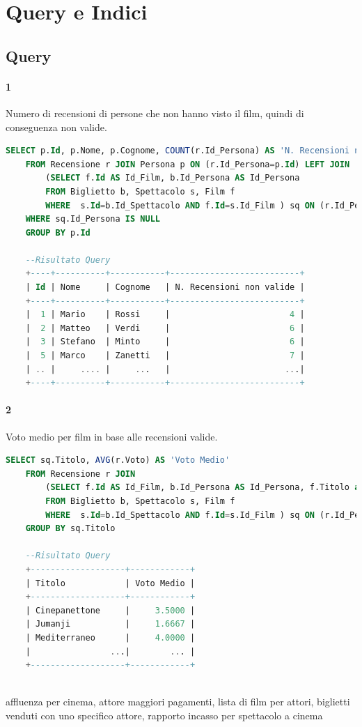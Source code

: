 \documentclass[10pt]{article}
\begin{document}
	\section{Query e Indici}
	\subsection{Query}
	\paragraph{1}
	Numero di recensioni di persone che non hanno visto il film, quindi di conseguenza non valide.		
	\begin{lstlisting}[language=SQL]
	SELECT p.Id, p.Nome, p.Cognome, COUNT(r.Id_Persona) AS 'N. Recensioni non valide'
	FROM Recensione r JOIN Persona p ON (r.Id_Persona=p.Id) LEFT JOIN
		(SELECT f.Id AS Id_Film, b.Id_Persona AS Id_Persona
		FROM Biglietto b, Spettacolo s, Film f
		WHERE  s.Id=b.Id_Spettacolo AND f.Id=s.Id_Film ) sq ON (r.Id_Persona= sq.Id_persona AND r.Id_Film=sq.Id_Film)
	WHERE sq.Id_Persona IS NULL
	GROUP BY p.Id
	
	--Risultato Query
	+----+----------+-----------+--------------------------+
	| Id | Nome     | Cognome   | N. Recensioni non valide |
	+----+----------+-----------+--------------------------+
	|  1 | Mario    | Rossi     |                        4 |
	|  2 | Matteo   | Verdi     |                        6 |
	|  3 | Stefano  | Minto     |                        6 |
	|  5 | Marco    | Zanetti   |                        7 |
	| .. |     .... |     ...   |                       ...|
	+----+----------+-----------+--------------------------+	
	\end{lstlisting}
	\paragraph{2}
	Voto medio per film in base alle recensioni valide.
		\begin{lstlisting}[language=SQL]
	SELECT sq.Titolo, AVG(r.Voto) AS 'Voto Medio'
	FROM Recensione r JOIN
		(SELECT f.Id AS Id_Film, b.Id_Persona AS Id_Persona, f.Titolo as Titolo
		FROM Biglietto b, Spettacolo s, Film f
		WHERE  s.Id=b.Id_Spettacolo AND f.Id=s.Id_Film ) sq ON (r.Id_Persona= sq.Id_persona AND r.Id_Film=sq.Id_Film)
	GROUP BY sq.Titolo
	
	--Risultato Query
	+-------------------+------------+
	| Titolo            | Voto Medio |
	+-------------------+------------+
	| Cinepanettone     |     3.5000 |
	| Jumanji           |     1.6667 |
	| Mediterraneo      |     4.0000 |
	|                ...|        ... |
	+-------------------+------------+
	
	\end{lstlisting}
	 affluenza per cinema, attore maggiori pagamenti, lista di film per attori, biglietti venduti con uno specifico attore, rapporto incasso per spettacolo a cinema
\end{document}
